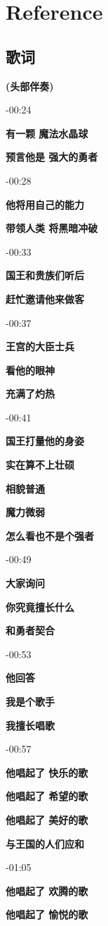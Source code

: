 \documentclass[a4paper]{article}
\begin{document}
\section{Reference}

\subsection{歌词}

\textbf{(头部伴奏)}

-00:24

\textbf{有一颗 魔法水晶球}

\textbf{预言他是 强大的勇者}

-00:28

\textbf{他将用自己的能力}

\textbf{带领人类 将黑暗冲破}

-00:33

\textbf{国王和贵族们听后}

\textbf{赶忙邀请他来做客}

-00:37

\textbf{王宫的大臣士兵}

\textbf{看他的眼神}

\textbf{充满了灼热}

-00:41

\textbf{国王打量他的身姿}

\textbf{实在算不上壮硕}

\textbf{相貌普通}

\textbf{魔力微弱}

\textbf{怎么看也不是个强者}

-00:49

\textbf{大家询问}

\textbf{你究竟擅长什么}

\textbf{和勇者契合}

-00:53

\textbf{他回答}

\textbf{我是个歌手}

\textbf{我擅长唱歌}

-00:57

\textbf{他唱起了 快乐的歌}

\textbf{他唱起了 希望的歌}

\textbf{他唱起了 美好的歌}

\textbf{与王国的人们应和}

-01:05

\textbf{他唱起了 欢腾的歌}

\textbf{他唱起了 愉悦的歌}
\end{document}
